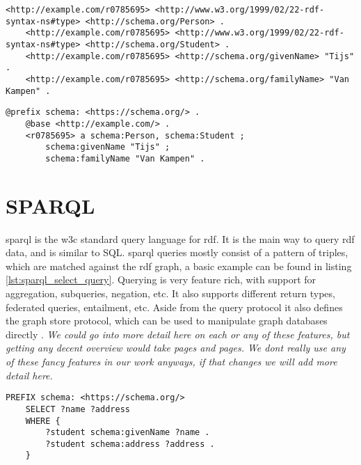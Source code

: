 \begin{lstlisting}[caption={Basic naive turtle document}, label={lst:basic_turtle_example}, captionpos=b, breaklines=true]
    <http://example.com/r0785695> <http://www.w3.org/1999/02/22-rdf-syntax-ns#type> <http://schema.org/Person> .
    <http://example.com/r0785695> <http://www.w3.org/1999/02/22-rdf-syntax-ns#type> <http://schema.org/Student> .
    <http://example.com/r0785695> <http://schema.org/givenName> "Tijs" .
    <http://example.com/r0785695> <http://schema.org/familyName> "Van Kampen" .
\end{lstlisting}

\begin{lstlisting}[caption={Basic turtle document using turtle features}, label={lst:basic_turtle_example_concise}, captionpos=b, breaklines=true]
    @prefix schema: <https://schema.org/> .
    @base <http://example.com/> .
    <r0785695> a schema:Person, schema:Student ;
        schema:givenName "Tijs" ;
        schema:familyName "Van Kampen" .
\end{lstlisting}


\section{SPARQL}
\acrfull{sparql} is the \acrshort{w3c} standard query language for \acrshort{rdf}. It is the main way to query \acrshort{rdf} data, and is similar to SQL. \acrshort{sparql} queries mostly consist of a pattern of triples, which are matched against the \acrshort{rdf} graph, a basic example can be found in listing \ref{lst:sparql_select_query}. Querying is very feature rich, with support for aggregation, subqueries, negation, etc. It also supports different return types, federated queries, entailment, etc. \citep{SPARQL1.1QL} Aside from the query protocol it also defines the graph store protocol, which can be used to manipulate graph databases directly \citep{SPARQL1.1}. \textit{We could go into more detail here on each or any of these features, but getting any decent overview would take pages and pages. We dont really use any of these fancy features in our work anyways, if that changes we will add more detail here.}

\begin{lstlisting}[language=SPARQL, caption={Example of a basic \acrshort{sparql} SELECT query}, label={lst:sparql_select_query}, captionpos=b]
    PREFIX schema: <https://schema.org/>
    SELECT ?name ?address
    WHERE {
        ?student schema:givenName ?name .
        ?student schema:address ?address .
    }
\end{lstlisting}

